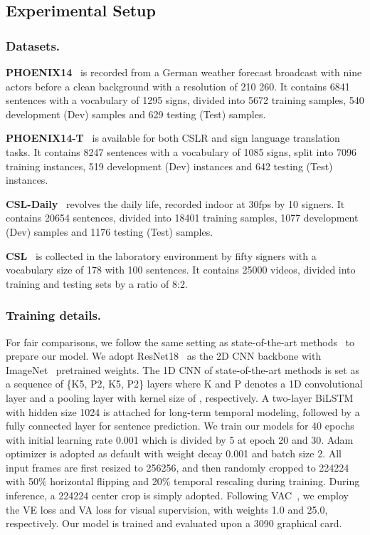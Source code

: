 \documentclass[10pt,twocolumn,letterpaper]{article}
\begin{document}
\subsection{Experimental Setup}
\subsubsection{Datasets.} \textbf{PHOENIX14}~\cite{koller2015continuous} is recorded from a German weather forecast broadcast with nine actors before a clean background with a resolution of 210  260. It contains 6841 sentences with a vocabulary of 1295 signs, divided into 5672 training samples, 540 development (Dev) samples and 629 testing (Test) samples.

\textbf{PHOENIX14-T}~\cite{camgoz2018neural} is available for both CSLR and sign language translation tasks. It contains 8247 sentences with a vocabulary of 1085 signs, split into 7096 training instances, 519 development (Dev) instances and 642 testing (Test) instances.

\textbf{CSL-Daily}~\cite{zhou2021improving} revolves the daily life, recorded indoor at 30fps by 10 signers. It contains 20654 sentences, divided into 18401 training samples, 1077 development (Dev) samples and 1176 testing (Test) samples. 

\textbf{CSL}~\cite{huang2018video} is collected in the laboratory environment by fifty signers with a vocabulary size of 178 with 100 sentences. It contains 25000 videos, divided into training and testing sets by a ratio of 8:2.

\subsubsection{Training details.} For fair comparisons, we follow the same setting as state-of-the-art methods~\cite{Min_2021_ICCV,zuo2022c2slr} to prepare our model. We adopt ResNet18~\cite{he2016deep} as the 2D CNN backbone with ImageNet~\cite{deng2009imagenet} pretrained weights. The 1D CNN of state-of-the-art methods is set as a sequence of \{K5, P2, K5, P2\} layers where K and P denotes a 1D convolutional layer and a pooling layer with kernel size of , respectively. A two-layer BiLSTM with hidden size 1024 is attached for long-term temporal modeling, followed by a fully connected layer for sentence prediction. We train our models for 40 epochs with initial learning rate 0.001 which is divided by 5 at epoch 20 and 30. Adam~\cite{kingma2014adam} optimizer is adopted as default with weight decay 0.001 and batch size 2. All input frames are first resized to 256256, and then randomly cropped to 224224 with 50\% horizontal flipping and 20\% temporal rescaling during training. During inference, a 224224 center crop is simply adopted. Following VAC~\cite{Min_2021_ICCV}, we employ the VE loss and VA loss for visual supervision, with weights 1.0 and 25.0, respectively. Our model is trained and evaluated upon a 3090 graphical card.
\end{document}
